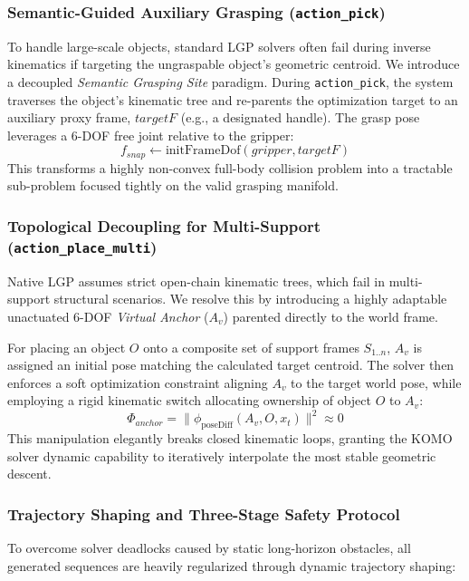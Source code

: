 \documentclass[journal]{IEEEtran}
\begin{document}
  \subsubsection{Semantic-Guided Auxiliary Grasping (\texttt{action\_pick})}
  To handle large-scale objects, standard LGP solvers often fail during inverse
  kinematics if targeting the ungraspable object's geometric centroid. We introduce
  a decoupled \textit{Semantic Grasping Site} paradigm. During \texttt{action\_pick},
  the system traverses the object's kinematic tree and re-parents the optimization
  target to an auxiliary proxy frame, $targetF$ (e.g., a designated handle). The
  grasp pose leverages a 6-DOF free joint relative to the gripper:
  \begin{equation}
    f_{snap}\leftarrow \text{initFrameDof}(gripper, targetF)
  \end{equation}
  This transforms a highly non-convex full-body collision problem into a
  tractable sub-problem focused tightly on the valid grasping manifold.

  \subsubsection{Topological Decoupling for Multi-Support (\texttt{action\_place\_multi})}
  Native LGP assumes strict open-chain kinematic trees, which fail in multi-support
  structural scenarios. We resolve this by introducing a highly adaptable
  unactuated 6-DOF \textit{Virtual Anchor} ($A_{v}$) parented directly to the world
  frame.

  For placing an object $O$ onto a composite set of support frames $S_{1..n}$,
  $A_{v}$ is assigned an initial pose matching the calculated target centroid. The
  solver then enforces a soft optimization constraint aligning $A_{v}$ to the target
  world pose, while employing a rigid kinematic switch allocating ownership of
  object $O$ to $A_{v}$:
  \begin{equation}
    \Phi_{anchor}= \| \phi_{\text{poseDiff}}( A_{v}, O, x_{t}) \|^{2}\approx 0
  \end{equation}
  This manipulation elegantly breaks closed kinematic loops, granting the KOMO
  solver dynamic capability to iteratively interpolate the most stable geometric
  descent.

  \subsubsection{Trajectory Shaping and Three-Stage Safety Protocol}
  To overcome solver deadlocks caused by static long-horizon obstacles, all generated
  sequences are heavily regularized through dynamic trajectory shaping:
\end{document}
